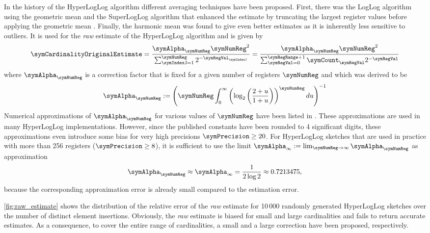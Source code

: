 \documentclass[a4paper]{scrartcl}
\begin{document}
In the history of the HyperLogLog algorithm different averaging techniques have been proposed. First, there was the LogLog algorithm using the geometric mean and the SuperLogLog algorithm that enhanced the estimate by truncating the largest register values before applying the geometric mean \cite{Durand2003}. Finally, the harmonic mean was found to give even better estimates as it is inherently less sensitive to outliers. It is used for the \emph{raw} estimate of the HyperLogLog algorithm and is given by
\begin{equation}
\label{equ:intermediate_estimate}
\symCardinalityOriginalEstimate
= 
\frac{\symAlpha_\symNumReg \symNumReg^2}{\sum_{\symIndexJ=1}^{\symNumReg}2^{-\symRegVal_\symIndexJ}}
= 
\frac{\symAlpha_\symNumReg \symNumReg^2}{\sum_{\symRegVal=0}^{\symRegRange+1}\symCount_\symRegVal 2^{-\symRegVal}}
\end{equation}
where $\symAlpha_\symNumReg$  is a correction factor that is fixed for a given number of registers $\symNumReg$ and which was derived to be \cite{Flajolet2007}
\begin{equation}
\symAlpha_\symNumReg := \left(
\symNumReg
\int_0^\infty
\left(
\log_2\left(
\frac{2+u}{1+u}
\right)
\right)^\symNumReg
du
\right)^{-1}
\end{equation}
Numerical approximations of $\symAlpha_\symNumReg$ for various values of $\symNumReg$ have been listed in \cite{Flajolet2007}. These approximations are used in many HyperLogLog implementations. However, since the published constants have been rounded to 4 significant digits, these approximations even introduce some bias for very high precisions $\symPrecision\geq 20$. For HyperLogLog sketches that are used in practice with more than 256 registers ($\symPrecision\geq 8$), it is sufficient to use the limit $\symAlpha_\infty := \lim_{\symNumReg\rightarrow\infty} \symAlpha_\symNumReg$ as approximation 
\begin{equation}
\symAlpha_\symNumReg \approx \symAlpha_\infty = \frac{1}{2\log 2} \approx 0.7213475,
\end{equation}
because the corresponding approximation error is already small compared to the estimation error.

\autoref{fig:raw_estimate} shows the distribution of the relative error of the \emph{raw} estimate for 10\,000 randomly generated HyperLogLog sketches over the number of distinct element insertions. Obviously, the \emph{raw} estimate is biased for small and large cardinalities and fails to return accurate estimates. As a consequence, to cover the entire range of cardinalities, a small and a large correction have been proposed, respectively.
\end{document}
